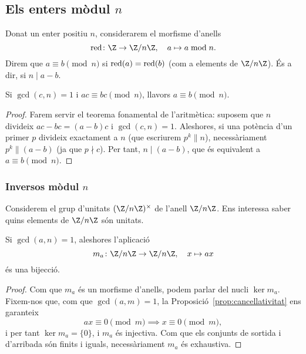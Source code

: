  \subsection{Els enters mòdul \texorpdfstring{$n$}{n}}
 Donat un enter positiu $n$, considerarem el morfisme d'anells
 \[
 \red\colon \Z\to\Z/n\Z,\quad a\mapsto a\bmod{n}.
 \]
 Direm que $a\equiv b\pmod{n}$ si $\operatorname{red}(a)=\operatorname{red}(b)$ (com a elements de $\Z/n\Z$). És a dir, si $n\mid a-b$.
 
 \begin{proposition}
 \label{prop:cancellativitat}
 Si $\gcd(c,n)=1$ i $ac\equiv bc\pmod{n}$, llavors $a\equiv b\pmod{n}$.
 \end{proposition}
\begin{proof}
 Farem servir el teorema fonamental de l'aritmètica: suposem que $n$ divideix $ac-bc = (a-b)c$ i $\gcd(c,n)=1$. Aleshores, si una potència d'un primer $p$ divideix exactament a $n$ (que escriurem $p^k\parallel n$), necessàriament $p^k\parallel (a-b)$ (ja que $p\nmid c$). Per tant, $n\mid (a-b)$, que és equivalent a $a\equiv b\pmod n$.
\end{proof}
 \subsubsection{Inversos mòdul \texorpdfstring{$n$}{n}}
 Considerem el grup d'unitats $(\Z/n\Z)^\times$ de l'anell $\Z/n\Z$. Ens interessa saber quins elements de $\Z/n\Z$ són unitats.
 
 
 \begin{proposition}
 Si $\gcd(a,n)=1$, aleshores l'aplicació
 \[
 m_a\colon \Z/n\Z\to\Z/n\Z,\quad x\mapsto ax
 \]
 és una bijecció.
 \end{proposition}
 \begin{proof}
Com que $m_a$ és un morfisme d'anells, podem parlar del nucli $\ker m_a$. Fixem-nos que, com que $\gcd(a,m)=1$, la Proposició~\ref{prop:cancellativitat} ens garanteix
\[
ax\equiv 0\pmod{m}\implies x\equiv 0\pmod{m},
\]
i per tant $\ker m_a=\{0\}$, i $m_a$ és injectiva. Com que els conjunts de sortida i d'arribada són finits i iguals, necessàriament $m_a$ és exhaustiva.
 \end{proof}
 
